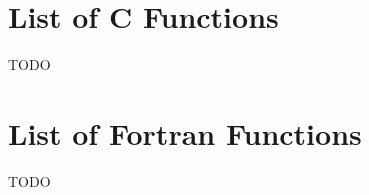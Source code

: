 \documentclass[oneside,english]{book}
\begin{document}
\date{December, 2011}

\tableofcontents{}

























\appendix

\chapter{List of C Functions}

TODO

\chapter{List of Fortran Functions}

TODO


\end{document}
